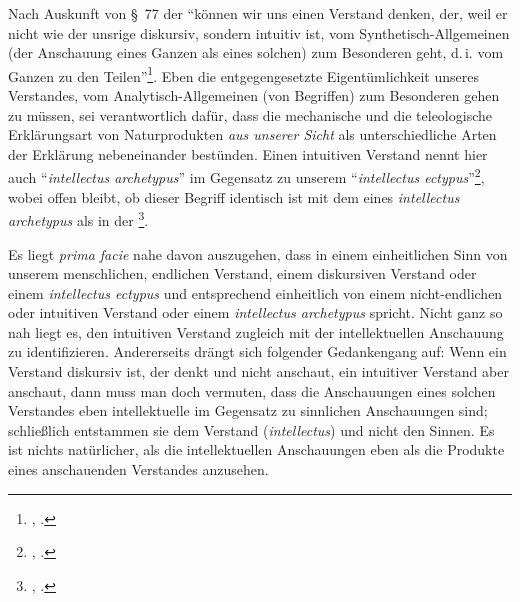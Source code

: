 \begin{nummerierung}
 \item\label{IntuitiverVerstandvomAllgemeinenzumBesonderen} Nach Auskunft von
 \S~77 der  \enquote{können wir uns {\punkt}
 einen Verstand denken, der, weil er nicht wie der unsrige diskursiv, sondern
 intuitiv ist, vom Synthetisch-Allgemeinen (der Anschauung eines Ganzen als
 eines solchen) zum Besonderen geht, d.\,i. vom Ganzen zu den
 Teilen}\footnote{\cite[][\S~77]{Kant:KritikderUrteilskraft2009}, \cite[][V:
 407.19--23]{Kant:GesammelteWerke1900ff.}.}. Eben die entgegengesetzte
 Eigentümlichkeit unseres Verstandes, vom Analytisch-Allgemeinen (von Begriffen)
 zum Besonderen gehen zu müssen, sei verantwortlich dafür, dass die mechanische und
 die teleologische Erklärungsart von Naturprodukten \emph{aus unserer Sicht} als
 unterschiedliche Arten der Erklärung nebeneinander bestünden. Einen intuitiven
 Verstand nennt  hier auch \enquote{\emph{intellectus
 archetypus}} im Gegensatz zu unserem \enquote{\emph{intellectus
 ectypus}}\footnote{\cite[Siehe][\S~77]{Kant:KritikderUrteilskraft2009},
 \cite[][V: 408.18--23]{Kant:GesammelteWerke1900ff.}.}, wobei offen bleibt, ob
 dieser Begriff identisch ist mit dem eines \emph{intellectus archetypus} als
  in der \footnote{\cite[Siehe][B 723]{Kant:KritikderreinenVernunft2003},
 \cite[][III: 456.37]{Kant:GesammelteWerke1900ff.}.}.
\end{nummerierung}


Es liegt \emph{prima facie} nahe davon auszugehen, dass  in
einem einheitlichen Sinn von unserem menschlichen, endlichen Verstand, einem
diskursiven Verstand oder einem \emph{intellectus ectypus} und entsprechend einheitlich von
einem nicht-endlichen oder intuitiven Verstand oder einem \emph{intellectus
archetypus} spricht. Nicht ganz so nah liegt es, den intuitiven Verstand zugleich
mit der intellektuellen Anschauung zu identifizieren. Andererseits drängt sich
folgender Gedankengang auf: Wenn ein Verstand diskursiv ist, der denkt und nicht
anschaut, ein intuitiver Verstand aber anschaut, dann muss man doch vermuten,
dass die Anschauungen eines solchen Verstandes eben intellektuelle im Gegensatz
zu sinnlichen Anschauungen sind; schließlich entstammen sie dem Verstand
(\emph{intellectus}) und nicht den Sinnen. Es ist nichts natürlicher, als die
intellektuellen Anschauungen eben als die Produkte eines anschauenden Verstandes
anzusehen.


